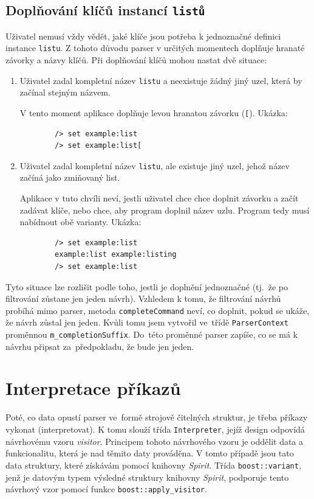 \documentclass[thesis=B,czech,hidelinks]{FITthesis}[2019/03/06]
\begin{document}
\subsection{Doplňování klíčů instancí \texttt{listů}}
Uživatel nemusí vždy vědět, jaké klíče jsou potřeba k jednoznačné definici instance \texttt{listu}. Z tohoto důvodu parser v určitých momentech doplňuje hranaté závorky a názvy klíčů. Při doplňování klíčů mohou nastat dvě situace:

\begin{enumerate}
    \item Uživatel zadal kompletní název \texttt{listu} a neexistuje žádný jiný uzel, která by začínal stejným názvem.

        V tento moment aplikace doplňuje levou hranatou závorku (\verb¨[¨). Ukázka:
        \begin{verbatim}
        /> set example:list
        /> set example:list[
        \end{verbatim}

    \item Uživatel zadal kompletní název \texttt{listu}, ale existuje jiný uzel, jehož název začíná jako zmiňovaný list.

        Aplikace v tuto chvíli neví, jestli uživatel chce chce doplnit závorku a začít zadávat klíče, nebo chce, aby program doplnil název uzlu. Program tedy musí nabídnout obě varianty. Ukázka:
        \begin{verbatim}
        /> set example:list
        example:list example:listing
        /> set example:list
        \end{verbatim}

\end{enumerate}
Tyto situace lze rozlišit podle toho, jestli je doplnění jednoznačné (tj.\ že po filtrování zůstane jen jeden návrh). Vzhledem k tomu, že filtrování návrhů probíhá mimo parser, metoda \texttt{completeCommand} neví, co doplnit, pokud se ukáže, že návrh zůstal jen jeden. Kvůli tomu jsem vytvořil ve~třídě \texttt{ParserContext} proměnnou \texttt{m\_completionSuffix}. Do~této proměnné parser zapíše, co se má k návrhu připsat za~předpokladu, že bude jen jeden.


\section{Interpretace příkazů}\label{interpreter}
Poté, co data opustí parser ve~formě strojově čitelných struktur, je třeba příkazy vykonat (interpretovat). K tomu slouží třída \texttt{Interpreter}, jejíž design odpovídá návrhovému vzoru \textit{visitor}. Principem tohoto návrhového vzoru je oddělit data a funkcionalitu, která je nad těmito daty prováděna. V tomto případě jsou tato data struktury, které získávám pomocí knihovny \textit{Spirit}. Třída \texttt{boost::variant}, jenž je datovým typem výsledné struktury knihovny \textit{Spirit}, podporuje tento návrhový vzor pomocí funkce \texttt{boost::apply\_visitor}.
\end{document}
